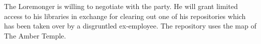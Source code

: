 The Loremonger is willing to negotiate with the party.
He will grant limited access to his libraries in exchange for clearing out one of his repositories which has been taken over by a disgruntled ex-employee.
The repository uses the map of The Amber Temple.